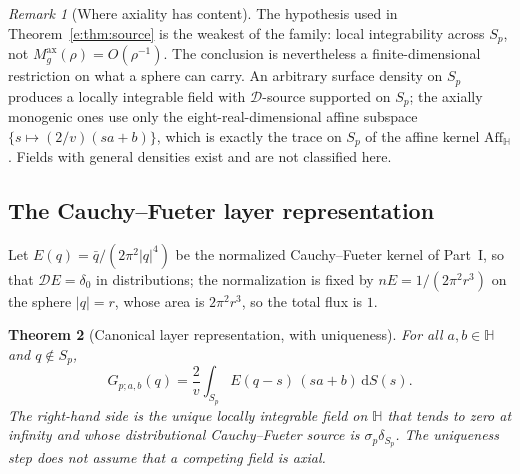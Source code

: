 \documentclass[11pt,a4paper]{article}
\numberwithin{equation}{section}
\newtheorem{theorem}{Theorem}[section]
\theoremstyle{definition}
\theoremstyle{remark}
\newtheorem{remark}[theorem]{Remark}
\theoremstyle{plain}
\newcommand{\HH}{\mathbb H}
\newcommand{\Dop}{\mathcal D}
\newcommand{\Aff}{\mathrm{Aff}_{\HH}}
\newcommand{\Sp}{S_{p}}
\newcommand{\Max}{M^{\mathrm{ax}}}                    %
\newcommand{\abs}[1]{\lvert #1\rvert}
\newcommand{\dd}{\mathrm d}
\begin{document}
\begin{remark}[Where axiality has content]
\label{e:rem:affine-density}
The hypothesis used in Theorem~\ref{e:thm:source} is the weakest of the
family: local integrability across $\Sp$, not $\Max_g(\rho)=O(\rho^{-1})$.
The conclusion is nevertheless a finite-dimensional restriction on what a
sphere can carry. An arbitrary surface density on $\Sp$ produces a
locally integrable field with $\Dop$-source supported on $\Sp$; the
axially monogenic ones use only the eight-real-dimensional affine
subspace $\{s\mapsto(2/v)(sa+b)\}$, which is exactly the trace on $\Sp$ of
the affine kernel $\Aff$. Fields with general densities exist and are not
classified here.
\end{remark}

\subsection{The Cauchy--Fueter layer representation}
\label{e:sec:layer}

Let $E(q)=\bar q/(2\pi^2\abs q^4)$ be the normalized Cauchy--Fueter
kernel of Part~I, so that $\Dop E=\delta_0$ in distributions; the
normalization is fixed by $nE=1/(2\pi^2r^3)$ on the sphere $\abs q=r$,
whose area is $2\pi^2r^3$, so the total flux is $1$.

\begin{theorem}[Canonical layer representation, with uniqueness]
\label{e:thm:layer}
For all $a,b\in\HH$ and $q\notin\Sp$,
\begin{equation}
 G_{p;a,b}(q)=\frac2v\int_{\Sp}E(q-s)\,(sa+b)\,\dd S(s).
 \label{e:eq:layer}
\end{equation}
The right-hand side is the \emph{unique} locally integrable field on
$\HH$ that tends to zero at infinity and whose distributional
Cauchy--Fueter source is $\sigma_p\delta_{\Sp}$. The uniqueness step does
not assume that a competing field is axial.
\end{theorem}
\end{document}
